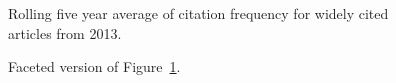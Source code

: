 \documentclass[
  10pt,
  letterpaper,
  DIV=11,
  numbers=noendperiod,
  twoside]{scrartcl}
\begin{document}
\begin{figure}


\caption{\label{fig-citation-spaghetti-2013}Rolling five year average of
citation frequency for widely cited articles from 2013.}

\end{figure}%

\begin{figure}


\caption{\label{fig-citation-facet-2013}Faceted version of
Figure~\ref{fig-citation-spaghetti-2013}.}

\end{figure}%
\end{document}
